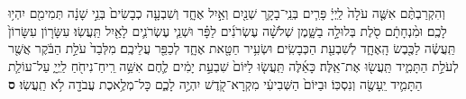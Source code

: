 \documentclass[twoside, openany, parskip=half, 11pt]{book}
\begin{document}
\begin{footnotesize}
\begin{multicols}{2}
\\
\\
וְהִקְרַבְתֶּ֨ם אִשֶּׁ֤ה עֹלָה֙ לַֽיְיָ֔ פָּרִ֧ים בְּנֵֽי־בָקָ֛ר שְׁנַ֖יִם וְאַ֣יִל אֶחָ֑ד וְשִׁבְעָ֤ה כְבָשִׂים֙ בְּנֵ֣י שָׁנָ֔ה תְּמִימִ֖ם יִהְי֥וּ לָכֶֽם׃ וּמִ֨נְחָתָ֔ם סֹ֖לֶת בְּלוּלָ֣ה בַשָּׁ֑מֶן שְׁלֹשָׁ֨ה עֶשְׂרֹנִ֜ים לַפָּ֗ר וּשְׁנֵ֧י עֶשְׂרֹנִ֛ים לָאַ֖יִל תַּֽעֲשֽׂוּ׃ עִשָּׂר֤וֹן עִשָּׂרוֹן֙ תַּֽעֲשֶׂ֔ה לַכֶּ֖בֶשׂ הָֽאֶחָ֑ד לְשִׁבְעַ֖ת הַכְּבָשִֽׂים׃ וּשְׂעִ֥יר חַטָּ֖את אֶחָ֑ד לְכַפֵּ֖ר עֲלֵיכֶֽם׃ מִלְּבַד֙ עֹלַ֣ת הַבֹּ֔קֶר אֲשֶׁ֖ר לְעֹלַ֣ת הַתָּמִ֑יד תַּֽעֲשׂ֖וּ אֶת־אֵֽלֶּה׃ כָּאֵ֜לֶּה תַּֽעֲשׂ֤וּ לַיּוֹם֙ שִׁבְעַ֣ת יָמִ֔ים לֶ֛חֶם אִשֵּׁ֥ה רֵֽיחַ־נִיחֹ֖חַ לַֽיְיָ֑ עַל־עוֹלַ֧ת הַתָּמִ֛יד יֵֽעָשֶׂ֖ה וְנִסְכּֽוֹ׃ וּבַיּוֹם֙ הַשְּׁבִיעִ֔י מִקְרָא־קֹ֖דֶשׁ יִהְיֶ֣ה לָכֶ֑ם כָּל־מְלֶ֥אכֶת עֲבֹדָ֖ה לֹ֥א תַֽעֲשֽׂוּ׃ \textbf{ס} 


\end{multicols}
\end{footnotesize}
\end{document}
